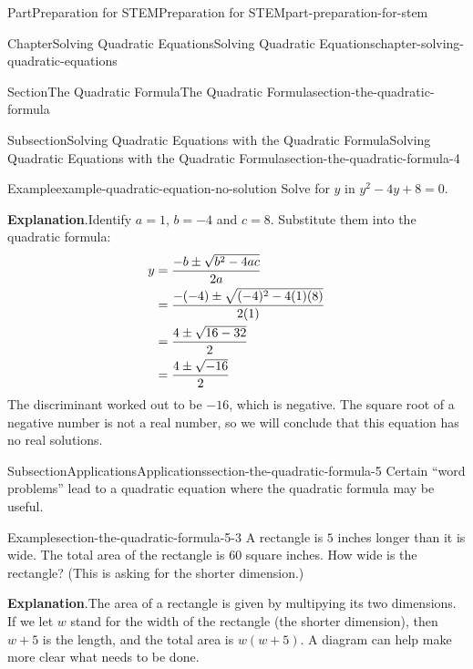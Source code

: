 \documentclass[twoside,10pt,]{book}
\newcommand{\blocktitlefont}{\relax}
\numberwithin{equation}{section}
\newcommand{\substitute}[1]{{\color{blue}{{#1}}}}
\newcommand{\amp}{&}
\begin{document}
\begin{partptx}{Part}{Preparation for STEM}{}{Preparation for STEM}{}{}{part-preparation-for-stem}
\begin{chapterptx}{Chapter}{Solving Quadratic Equations}{}{Solving Quadratic Equations}{}{}{chapter-solving-quadratic-equations}
\begin{sectionptx}{Section}{The Quadratic Formula}{}{The Quadratic Formula}{}{}{section-the-quadratic-formula}
\begin{subsectionptx}{Subsection}{Solving Quadratic Equations with the Quadratic Formula}{}{Solving Quadratic Equations with the Quadratic Formula}{}{}{section-the-quadratic-formula-4}
\begin{example}{Example}{}{example-quadratic-equation-no-solution}
Solve for \(y\) in \(y^2-4y+8=0\).%
\par\smallskip%
{\makeatletter{}\makeatother\noindent\textbf{\blocktitlefont Explanation}.\hypertarget{example-quadratic-equation-no-solution-2}{}\quad{}Identify \(a=1\), \(b=-4\) and \(c=8\). Substitute them into the quadratic formula:%
\begin{align*}
y\amp=\frac{-b\pm\sqrt{b^2-4ac}}{2a}\\
\amp=\frac{-(\substitute{-4})\pm\sqrt{(\substitute{-4})^2-4(\substitute{1})(\substitute{8})}}{2(\substitute{1})}\\
\amp=\frac{4\pm\sqrt{16-32}}{2}\\
\amp=\frac{4\pm\sqrt{-16}}{2}
\end{align*}
The discriminant worked out to be \(-16\), which is negative. The square root of a negative number is not a real number, so we will conclude that this equation has no real solutions.%
}\end{example}
\end{subsectionptx}
%
%
\typeout{************************************************}
\typeout{************************************************}
%
\begin{subsectionptx}{Subsection}{Applications}{}{Applications}{}{}{section-the-quadratic-formula-5}
Certain ``word problems'' lead to a quadratic equation where the quadratic formula may be useful.%
\begin{example}{Example}{}{section-the-quadratic-formula-5-3}%
A rectangle is \(5\) inches longer than it is wide. The total area of the rectangle is 60 square inches. How wide is the rectangle? (This is asking for the shorter dimension.)%
\par\smallskip%
{\makeatletter{}\makeatother\noindent\textbf{\blocktitlefont Explanation}.\hypertarget{section-the-quadratic-formula-5-3-2}{}\quad{}The area of a rectangle is given by multipying its two dimensions. If we let \(w\) stand for the width of the rectangle (the shorter dimension), then \(w+5\) is the length, and the total area is \(w(w+5)\). A diagram can help make more clear what needs to be done.%
}


\end{example}
\end{subsectionptx}
\end{sectionptx}
\end{chapterptx}
\end{partptx}
\end{document}
